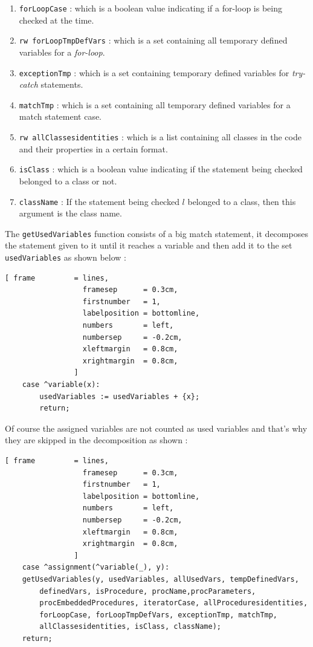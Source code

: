 \documentclass[11pt]{report}
\begin{document}
\begin{enumerate}
\item \texttt{forLoopCase} : which is a boolean value indicating if a for-loop is being checked at the time.

\item \texttt{rw forLoopTmpDefVars} : which is a set containing all temporary defined variables for a \textsl{for-loop}.

\item \texttt{exceptionTmp} : which is a set containing temporary defined variables for \textsl{try-catch} statements.

\item \texttt{matchTmp} : which is a set containing all temporary defined variables for a match statement case.

\item \texttt{rw allClassesidentities} : which is a list containing all classes in the code and their properties in a certain format.

\item \texttt{isClass} : which is a boolean value indicating if the statement being checked belonged to a class or not.

\item \texttt{className} : If the statement being checked $l$ belonged to a class, then this argument is the class name.

\end{enumerate}

The \texttt{getUsedVariables} function consists of a big match statement, it decomposes the statement given to it until it reaches a variable and then add it to the set \texttt{usedVariables} as shown below :

\begin{Verbatim}[ frame         = lines, 
                  framesep      = 0.3cm, 
                  firstnumber   = 1,
                  labelposition = bottomline,
                  numbers       = left,
                  numbersep     = -0.2cm,
                  xleftmargin   = 0.8cm,
                  xrightmargin  = 0.8cm,
                ]
    case ^variable(x):
		usedVariables := usedVariables + {x};
		return;
\end{Verbatim}

Of course the assigned variables are not counted as used variables and that's why they are skipped in the decomposition as shown :

\begin{Verbatim}[ frame         = lines, 
                  framesep      = 0.3cm, 
                  firstnumber   = 1,
                  labelposition = bottomline,
                  numbers       = left,
                  numbersep     = -0.2cm,
                  xleftmargin   = 0.8cm,
                  xrightmargin  = 0.8cm,
                ]
    case ^assignment(^variable(_), y): 
	getUsedVariables(y, usedVariables, allUsedVars, tempDefinedVars,
	    definedVars, isProcedure, procName,procParameters,
	    procEmbeddedProcedures, iteratorCase, allProceduresidentities, 
	    forLoopCase, forLoopTmpDefVars, exceptionTmp, matchTmp,
	    allClassesidentities, isClass, className); 
	return;
\end{Verbatim}
\end{document}
